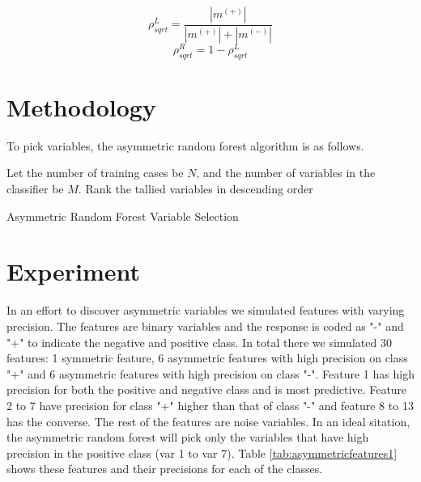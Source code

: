  \begin{equation}\label{eqn:rho_sqrt}
	\rho_{sqrt}^L = \frac{|m^{(+)}|}{|m^{(+)}|+|m^{(-)}|}
\end{equation}
\begin{equation}
	\rho_{sqrt}^R = 1- \rho_{sqrt}^L
\end{equation}


\section{Methodology}
To pick variables, the asymmetric random forest algorithm is as follows.

\begin{algorithm}
Let the number of training cases be $N$, and the number of variables in the classifier be $M$.
Rank the tallied variables in descending order 

\caption{Asymmetric Random Forest Variable Selection}\label{algo: AsymRandomForest}
\end{algorithm}

\section{Experiment}
In an effort to discover asymmetric variables we simulated features with varying precision. The features are binary variables and the response is coded as "-" and "+" to indicate the negative and positive class. In total there we simulated 30 features: 1 symmetric feature, 6 asymmetric features with high precision on class "+" and 6 asymmetric features with high precision on class "-". Feature 1 has high precision for both the positive and negative class and is most predictive. Feature 2 to 7 have precision for class "+" higher than that of class "-" and feature 8 to 13 has the converse. The rest of the features are noise variables. In an ideal sitation, the asymmetric random forest will pick only the variables that have high precision in the positive class (var 1 to var 7). Table \ref{tab:asymmetricfeatures1} shows these features and their precisions for each of the classes. 

